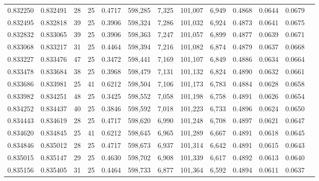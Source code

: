 \begin{tabular}{rrrrrrrrrrrrr}
0.832250 & 0.832491 &    28 &  25 &                                     0.4717 & 598,285 &   7,325 & 101,007 &   6,949 & 0.4868 & 0.0644 & 0.0679 \\
0.832495 & 0.832818 &    39 &  25 &                                     0.3906 & 598,324 &   7,286 & 101,032 &   6,924 & 0.4873 & 0.0641 & 0.0675 \\
0.832832 & 0.833065 &    39 &  25 &                                     0.3906 & 598,363 &   7,247 & 101,057 &   6,899 & 0.4877 & 0.0639 & 0.0671 \\
0.833068 & 0.833217 &    31 &  25 &                                     0.4464 & 598,394 &   7,216 & 101,082 &   6,874 & 0.4879 & 0.0637 & 0.0668 \\
0.833227 & 0.833476 &    47 &  25 &                                     0.3472 & 598,441 &   7,169 & 101,107 &   6,849 & 0.4886 & 0.0634 & 0.0664 \\
0.833478 & 0.833684 &    38 &  25 &                                     0.3968 & 598,479 &   7,131 & 101,132 &   6,824 & 0.4890 & 0.0632 & 0.0661 \\
0.833686 & 0.833981 &    25 &  41 &                                     0.6212 & 598,504 &   7,106 & 101,173 &   6,783 & 0.4884 & 0.0628 & 0.0658 \\
0.833982 & 0.834251 &    48 &  25 &                                     0.3425 & 598,552 &   7,058 & 101,198 &   6,758 & 0.4891 & 0.0626 & 0.0654 \\
0.834252 & 0.834437 &    40 &  25 &                                     0.3846 & 598,592 &   7,018 & 101,223 &   6,733 & 0.4896 & 0.0624 & 0.0650 \\
0.834443 & 0.834619 &    28 &  25 &                                     0.4717 & 598,620 &   6,990 & 101,248 &   6,708 & 0.4897 & 0.0621 & 0.0647 \\
0.834620 & 0.834845 &    25 &  41 &                                     0.6212 & 598,645 &   6,965 & 101,289 &   6,667 & 0.4891 & 0.0618 & 0.0645 \\
0.834846 & 0.835012 &    28 &  25 &                                     0.4717 & 598,673 &   6,937 & 101,314 &   6,642 & 0.4891 & 0.0615 & 0.0643 \\
0.835015 & 0.835147 &    29 &  25 &                                     0.4630 & 598,702 &   6,908 & 101,339 &   6,617 & 0.4892 & 0.0613 & 0.0640 \\
0.835156 & 0.835405 &    31 &  25 &                                     0.4464 & 598,733 &   6,877 & 101,364 &   6,592 & 0.4894 & 0.0611 & 0.0637 \\

\end{tabular}
